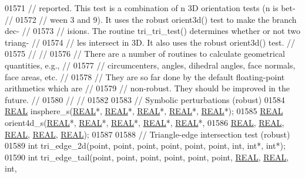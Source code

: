 \begin{DoxyCode}
01571 \textcolor{comment}{// reported. This test is a combination of n 3D orientation tests (n is bet- //}
01572 \textcolor{comment}{// ween 3 and 9). It uses the robust orient3d() test to make the branch dec- //}
01573 \textcolor{comment}{// isions.  The routine tri\_tri\_test() determines whether or not two triang- //}
01574 \textcolor{comment}{// les intersect in 3D. It also uses the robust orient3d() test.             //}
01575 \textcolor{comment}{//                                                                           //}
01576 \textcolor{comment}{// There are a number of routines to calculate geometrical quantities, e.g., //}
01577 \textcolor{comment}{// circumcenters, angles, dihedral angles, face normals, face areas, etc.    //}
01578 \textcolor{comment}{// They are so far done by the default floating-point arithmetics which are  //}
01579 \textcolor{comment}{// non-robust. They should be improved in the future.                        //}
01580 \textcolor{comment}{//                                                                           //}
01582 \textcolor{comment}{}
01583   \textcolor{comment}{// Symbolic perturbations (robust)}
01584   \hyperlink{tetgen_8h_a4b654506f18b8bfd61ad2a29a7e38c25}{REAL} insphere\_s(\hyperlink{tetgen_8h_a4b654506f18b8bfd61ad2a29a7e38c25}{REAL}*, \hyperlink{tetgen_8h_a4b654506f18b8bfd61ad2a29a7e38c25}{REAL}*, \hyperlink{tetgen_8h_a4b654506f18b8bfd61ad2a29a7e38c25}{REAL}*, \hyperlink{tetgen_8h_a4b654506f18b8bfd61ad2a29a7e38c25}{REAL}*, \hyperlink{tetgen_8h_a4b654506f18b8bfd61ad2a29a7e38c25}{REAL}*);
01585   \hyperlink{tetgen_8h_a4b654506f18b8bfd61ad2a29a7e38c25}{REAL} orient4d\_s(\hyperlink{tetgen_8h_a4b654506f18b8bfd61ad2a29a7e38c25}{REAL}*, \hyperlink{tetgen_8h_a4b654506f18b8bfd61ad2a29a7e38c25}{REAL}*, \hyperlink{tetgen_8h_a4b654506f18b8bfd61ad2a29a7e38c25}{REAL}*, \hyperlink{tetgen_8h_a4b654506f18b8bfd61ad2a29a7e38c25}{REAL}*, \hyperlink{tetgen_8h_a4b654506f18b8bfd61ad2a29a7e38c25}{REAL}*, 
01586                   \hyperlink{tetgen_8h_a4b654506f18b8bfd61ad2a29a7e38c25}{REAL}, \hyperlink{tetgen_8h_a4b654506f18b8bfd61ad2a29a7e38c25}{REAL}, \hyperlink{tetgen_8h_a4b654506f18b8bfd61ad2a29a7e38c25}{REAL}, \hyperlink{tetgen_8h_a4b654506f18b8bfd61ad2a29a7e38c25}{REAL}, \hyperlink{tetgen_8h_a4b654506f18b8bfd61ad2a29a7e38c25}{REAL});
01587 
01588   \textcolor{comment}{// Triangle-edge intersection test (robust)}
01589   \textcolor{keywordtype}{int} tri\_edge\_2d(point, point, point, point, point, point, \textcolor{keywordtype}{int}, \textcolor{keywordtype}{int}*, \textcolor{keywordtype}{int}*);
01590   \textcolor{keywordtype}{int} tri\_edge\_tail(point, point, point, point, point, point, \hyperlink{tetgen_8h_a4b654506f18b8bfd61ad2a29a7e38c25}{REAL}, \hyperlink{tetgen_8h_a4b654506f18b8bfd61ad2a29a7e38c25}{REAL}, \textcolor{keywordtype}{int},

\end{DoxyCode}
